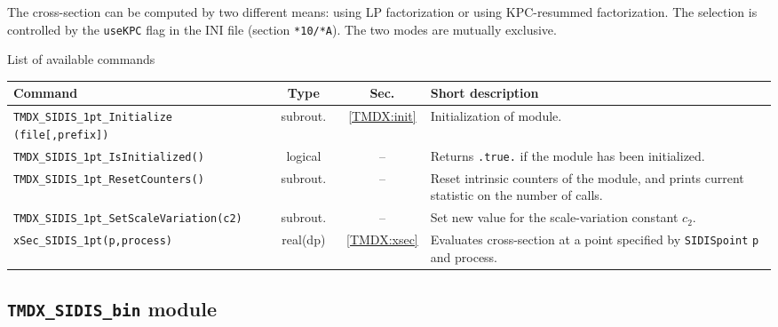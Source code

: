 \documentclass[prd,nofootinbib,eqsecnum,final]{revtex4}
\renewcommand{\(}{\left(}
\renewcommand{\)}{\right)}
\renewcommand{\[}{\left[}
\renewcommand{\]}{\right]}
\begin{document}
\begin{tcolorbox}
The cross-section can be computed by two different means: using LP factorization or using KPC-resummed factorization. The selection is controlled by the \texttt{useKPC} flag in the INI file (section \texttt{*10/*A}). The two modes are mutually exclusive.
\end{tcolorbox}

\begin{center}
List of available commands
\\
\begin{tabular}{||p{6cm}|c|c|p{8cm}||}
\hline\hline
Command & ~~Type~~& ~~Sec.~~ & Short description
\\\hline
\texttt{TMDX{\_}SIDIS{\_}1pt{\_}Initialize} \texttt{(file[,prefix])} & subrout. & \ref{TMDX:init} & Initialization of module.
\\\hline
\texttt{TMDX{\_}SIDIS{\_}1pt{\_}IsInitialized()} & logical & -- & Returns \texttt{.true.} if the module has been initialized.
\\\hline
\texttt{TMDX{\_}SIDIS{\_}1pt{\_}ResetCounters()} & subrout. & -- & Reset intrinsic counters of the module, and prints current statistic on the number of calls.
\\\hline
\texttt{TMDX{\_}SIDIS{\_}1pt{\_}SetScaleVariation(c2)} & subrout. & -- & Set new value for the scale-variation constant $c_2$.
\\\hline
\texttt{xSec\_SIDIS\_1pt(p,process)} & real(dp) &\ref{TMDX:xsec} & Evaluates cross-section at a point specified by \texttt{SIDISpoint} \texttt{p} and process.
\\\hline\hline
\end{tabular}
\end{center}

\subsection{\texttt{TMDX{\_}SIDIS{\_}bin} module}
\end{document}
